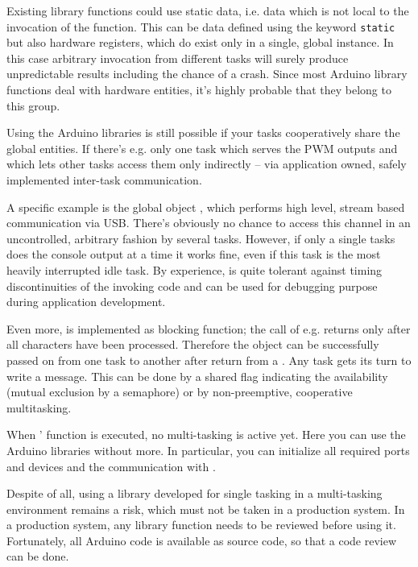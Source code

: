 Existing library functions could use static data, i.e. data which is not
local to the invocation of the function. This can be data defined using
the keyword \verb+static+ but also hardware registers, which do exist only
in a single, global instance. In this case arbitrary invocation from
different tasks will surely produce unpredictable results including the
chance of a crash. Since most Arduino library functions deal with hardware
entities, it's highly probable that they belong to this group.

Using the Arduino libraries is still possible if your tasks cooperatively
share the global entities. If there's e.g. only one task which serves the
PWM outputs and which lets other tasks access them only indirectly -- via
application owned, safely implemented inter-task communication.

A specific example is the global object , which performs
high level, stream based communication via USB. There's obviously no
chance to access this channel in an uncontrolled, arbitrary fashion by
several tasks. However, if only a single tasks does the console output at
a time it works fine, even if this task is the most heavily interrupted
idle task. By experience,  is quite tolerant against timing
discontinuities of the invoking code and can be used for debugging purpose
during application development.

Even more,  is implemented as blocking function; the call of
e.g.  returns only after all characters have been processed.
Therefore the object can be successfully passed on from one task to another
after return from a . Any task gets its turn to write a
message. This can be done by a shared flag indicating the availability
(mutual exclusion by a semaphore) or by non-preemptive, cooperative
multitasking.

When \rtos{}' function  is executed, no multi-tasking is
active yet. Here you can use the Arduino libraries without more. In
particular, you can initialize all required ports and devices and the
communication with .

Despite of all, using a library developed for single tasking in a
multi-tasking environment remains a risk, which must not be taken in a
production system. In a production system, any library function needs to
be reviewed before using it. Fortunately, all Arduino code is available as
source code, so that a code review can be done.


